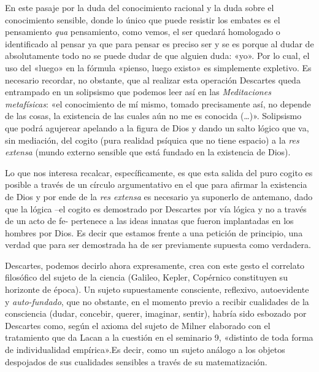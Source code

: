En este pasaje por la duda del conocimiento racional y la duda sobre el conocimiento sensible, donde lo único que puede resistir los embates es el pensamiento \emph{qua} pensamiento, como vemos, el ser quedará homologado o identificado al pensar ya que para pensar es preciso ser y se es porque al dudar de absolutamente todo no se puede dudar de que alguien duda: «yo». Por lo cual, el uso del «luego» en la fórmula «pienso, luego existo» es simplemente expletivo. Es necesario recordar, no obstante, que al realizar esta operación Descartes queda entrampado en un solipsismo que podemos leer así en las \emph{Meditaciones metafísicas}: «el conocimiento de mí mismo, tomado precisamente así, no depende de las cosas, la existencia de las cuales aún no me es conocida (\ldots)». Solipsismo que podrá agujerear apelando a la figura de Dios y dando un salto lógico que va, sin mediación, del cogito (pura realidad psíquica que no tiene espacio) a la \emph{res extensa} (mundo externo sensible que está fundado en la existencia de Dios).

Lo que nos interesa recalcar, específicamente, es que esta salida del puro cogito es posible a través de un círculo argumentativo en el que para afirmar la existencia de Dios y por ende de la \emph{res extensa} es necesario ya suponerlo de antemano, dado que la lógica --el cogito es demostrado por Descartes por vía lógica y no a través de un acto de fe- pertenece a las ideas innatas que fueron implantadas en los hombres por Dios. Es decir que estamos frente a una petición de principio, una verdad que para ser demostrada ha de ser previamente supuesta como verdadera.

Descartes, podemos decirlo ahora expresamente, crea con este gesto el correlato filosófico del sujeto de la ciencia (Galileo, Kepler, Copérnico constituyen su horizonte de época). Un sujeto supuestamente consciente, reflexivo, autoevidente y \emph{auto-fundado}, que no obstante, en el momento previo a recibir cualidades de la consciencia (dudar, concebir, querer, imaginar, sentir), habría sido esbozado por Descartes como, según el axioma del sujeto de Milner elaborado con el tratamiento que da Lacan a la cuestión en el seminario 9, «distinto de toda forma de individualidad empírica».Es decir, como un sujeto análogo a los objetos despojados de sus cualidades sensibles a través de su matematización.


